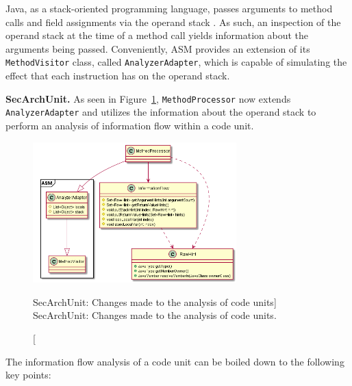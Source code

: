 Java, as a stack-oriented programming language, passes arguments to method calls and field assignments via the operand stack \cite{hutchison_information_2005}. As such, an inspection of the operand stack at the time of a method call yields information about the arguments being passed.
Conveniently, ASM provides an extension of its \texttt{MethodVisitor} class, called \texttt{AnalyzerAdapter}, which is capable of simulating the effect that each instruction has on the operand stack.

\textbf{SecArchUnit.} As seen in Figure~\ref{fig:method_processor_2}, \texttt{MethodProcessor} now extends \texttt{Analyzer\-Adapter} and utilizes the information about the operand stack to perform an analysis of information flow within a code unit.

\begin{figure}[H]
    \centering
    \includegraphics[width=0.7\textwidth]{figure/extension/MethodProcessor2.png}
    \caption
        [SecArchUnit: Changes made to the analysis of code units]
        {SecArchUnit: Changes made to the analysis of code units.}
    \label{fig:method_processor_2}
\end{figure}

The information flow analysis of a code unit can be boiled down to the following key points:

